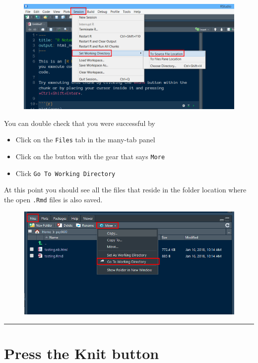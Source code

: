\documentclass[]{book}
\providecommand{\tightlist}{%
  \setlength{\itemsep}{0pt}\setlength{\parskip}{0pt}}
\begin{document}
\begin{figure}
\centering
\includegraphics{images/Set_wd_source.png}
\caption{}
\end{figure}

You can double check that you were successful by

\begin{itemize}
\tightlist
\item
  Click on the \texttt{Files} tab in the many-tab panel
\item
  Click on the button with the gear that says \texttt{More}
\item
  Click \texttt{Go\ To\ Working\ Directory}
\end{itemize}

At this point you should see all the files that reside in the folder
location where the open \texttt{.Rmd} files is also saved.

\begin{figure}
\centering
\includegraphics{images/files_goto_wd.png}
\caption{}
\end{figure}

\begin{center}\rule{0.5\linewidth}{\linethickness}\end{center}

\section{Press the Knit button}\label{press-the-knit-button}


\end{document}
